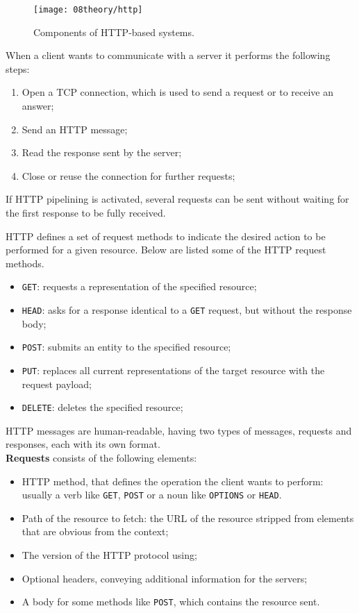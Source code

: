 \begin{figure}[H]
	\centering
	\texttt{[image: 08theory/http]}
	\caption{Components of HTTP-based systems.}
	\label{fig:http}
\end{figure}


When a client wants to communicate with a server it performs the following steps:
\begin{enumerate}
	\item Open a TCP connection, which is used to send a request or to receive an answer;
	\item Send an HTTP message;
	\item Read the response sent by the server;
	\item Close or reuse the connection for further requests;
\end{enumerate}

If HTTP pipelining is activated, several requests can be sent without waiting for the first response to be fully received.


HTTP defines a set of request methods to indicate the desired action to be performed for a given resource. Below are listed some of the HTTP request methods. \cite{http_methods}

\begin{itemize}
	\item \verb|GET|: requests a representation of the specified resource;
	\item \verb|HEAD|: asks for a response identical to a \verb|GET| request, but without the response body;
	\item \verb|POST|: submits an entity to the specified resource;
	\item \verb|PUT|: replaces all current representations of the target resource with the request payload;
	\item \verb|DELETE|: deletes the specified resource;
\end{itemize}


HTTP messages are human-readable, having two types of messages, requests and responses, each with its own format.\\

\textbf{Requests} consists of the following elements:
\begin{itemize}
	\item HTTP method, that defines the operation the client wants to perform: usually a verb like \verb|GET|, \verb|POST| or a noun like \verb|OPTIONS| or \verb|HEAD|.
	\item Path of the resource to fetch: the URL of the resource stripped from elements that are obvious from the context;
	\item The version of the HTTP protocol using;
	\item Optional headers, conveying additional information for the servers;
	\item A body for some methods like \verb|POST|, which contains the resource sent.
\end{itemize}

